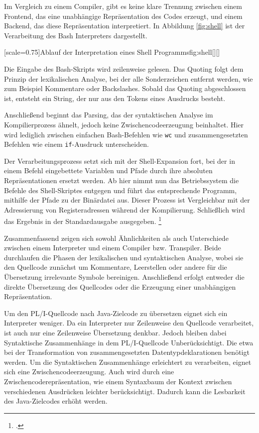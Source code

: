 Im Vergleich zu einem Compiler, gibt es keine klare Trennung zwischen einem Frontend, das eine unabhängige Repräsentation des Codes erzeugt, und einem Backend, das diese Repräsentation interpretiert. In Abbildung \ref{fig:shell} ist der Verarbeitung des Bash Interpreters dargestellt.


[scale=0.75]{Ablauf der Interpretation eines Shell Programms}{fig:shell}[][]
\pagebreak

Die Eingabe des Bash-Skripts wird zeilenweise gelesen.
Das Quoting folgt dem Prinzip der lexikalischen Analyse, bei der alle Sonderzeichen entfernt werden, wie zum Beispiel Kommentare oder Backslashes. Sobald das Quoting abgeschlossen ist, entsteht ein String, der nur aus den Tokens eines Ausdrucks besteht.

Anschließend beginnt das Parsing, das der syntaktischen Analyse im Kompilierprozess ähnelt, jedoch keine Zwischencodeerzeugung beinhaltet. Hier wird lediglich zwischen einfachen Bash-Befehlen wie \verb+wc+ und zusammengesetzten Befehlen wie einem \verb+if+-Ausdruck unterscheiden.

Der Verarbeitungsprozess setzt sich mit der Shell-Expansion fort, bei der in einem Befehl eingebettete Variablen und Pfade durch ihre absoluten Repräsentationen ersetzt werden.
Ab hier nimmt nun das Betriebssystem die Befehle des Shell-Skriptes entgegen und führt das entsprechende Programm, mithilfe der Pfade zu der Binärdatei aus. Dieser Prozess ist Vergleichbar mit der Adressierung von Registeradressen während der Kompilierung.
Schließlich wird das Ergebnis in der Standardausgabe ausgegeben. \footcite[Vgl. ][]{gnubash}


Zusammenfassend zeigen sich sowohl Ähnlichkeiten als auch Unterschiede zwischen einem Interpreter und einem Compiler bzw. Transpiler. Beide durchlaufen die Phasen der lexikalischen und syntaktischen Analyse, wobei sie den Quellcode zunächst um Kommentare, Leerstellen oder andere für die Übersetzung irrelevante Symbole bereinigen. Anschließend erfolgt entweder die direkte Übersetzung des Quellcodes oder die Erzeugung einer unabhängigen Repräsentation.

Um den PL/I-Quellcode nach Java-Zielcode zu übersetzen eignet sich ein Interpreter weniger. Da ein Interpreter nur Zeilenweise den Quellcode verarbeitet, ist auch nur eine Zeilenweise Übersetzung denkbar. Jedoch bleiben dabei Syntaktische Zusammenhänge in dem PL/I-Quellcode Unberücksichtigt. Die etwa bei der Transformation von zusammengesetzten Datentypdeklarationen benötigt werden. Um die Syntaktischen Zusammenhänge erleichtert zu verarbeiten, eignet sich eine Zwischencodeerzeugung.
Auch wird durch eine Zwischencoderepräsentation, wie einem Syntaxbaum der Kontext zwischen verschiedenen Ausdrücken leichter berücksichtigt. Dadurch kann die Lesbarkeit des Java-Zielcodes erhöht werden.

